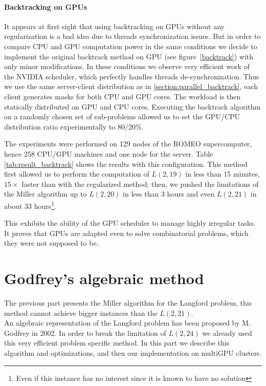 \paragraph{Backtracking on GPUs}

It appears at first sight that using backtracking on GPUs without any regularization is a bad idea due to threads synchronization issues.
But in order to compare CPU and GPU computation power in the same conditions we decide to implement the original backtrack method on GPU (see figure~\ref{backtrack}) with only minor modifications.
In these conditions we observe very efficient work of the NVIDIA scheduler, which perfectly handles threads de-synchronization.
Thus we use the same server-client distribution as in \ref{section:parallel_backtrack}, each client generates masks for both CPU and GPU cores. 
The workload is then statically distributed on GPU and CPU cores.
Executing the backtrack algorithm on a randomly chosen set of sub-problems allowed us to set the GPU/CPU distribution ratio experimentally to 80/20\%.

The experiments were performed on 129 nodes of the ROMEO supercomputer, hence 258 CPU/GPU machines and one node for the server. 
Table \ref{tab:result_backtrack} shows the results with this configuration. 
This method first allowed us to perform the computation of $L(2,19)$ in less than 15 minutes, $15\times$ faster than with the regularized method; then, we pushed the limitations of the Miller algorithm up to $L(2,20)$ in less than 3 hours and even $L(2,21)$ in about $33$ hours\footnote{Even if this instance has no interest since it is known to have no solution}.

This exhibits the ability of the GPU scheduler to manage highly irregular tasks. 
It proves that GPUs are adapted even to solve combinatorial problems, which they were not supposed to be.

\section{Godfrey's algebraic method}
The previous part presents the Miller algorithm for the Langford problem, this method cannot achieve bigger instances than the $L(2,21)$.\\
An algebraic representation of the Langford problem has been proposed by M. Godfrey in 2002.
In order to break the limitation of $L(2,24)$ we already used this very efficient problem specific method.
In this part we describe this algorithm and optimizations, and then our implementation on multiGPU clusters.
